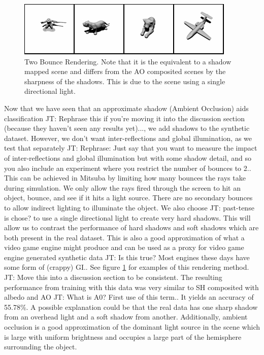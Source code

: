 \documentclass[10pt,twocolumn,letterpaper]{article}
\newcommand{\tompson}[1]{{\color{green} JT: #1}}
\begin{document}
\begin{figure}[h!]
\centering
\includegraphics[width=1.0\columnwidth]{./assets/2bounce_small.png}
\caption{Two Bounce Rendering.  Note that it is the equivalent to a shadow mapped scene and differs from the AO composited scenes by the sharpness of the shadows. This is due to the scene using a single directional light.}
\label{fig:2BOUNCE}
\end{figure}
Now that we have seen that an approximate shadow (Ambient Occlusion) aids classification \tompson{Rephrase this if you're moving it into the discussion section (because they haven't seen any results yet)...}, we add shadows to the synthetic dataset. However, we don't want inter-reflections and global illumination, as we test that separately \tompson{Rephrase: Just say that you want to measure the impact of inter-reflections and global illumination but with some shadow detail, and so you also include an experiment where you restrict the number of bounces to 2.}.  This can be achieved in Mitsuba by limiting how many bounces the rays take during simulation.  We only allow the rays fired through the screen to hit an object, bounce, and see if it hits a light source.  There are no secondary bounces to allow indirect lighting to illuminate the object. We also choose \tompson{past-tense is chose?} to use a single directional light to create very hard shadows.  This will allow us to contrast the performance of hard shadows and soft shadows which are both present in the real dataset.  This is also a good approximation of what a video game engine might produce and can be used as a proxy for video game engine generated synthetic data \tompson{Is this true? Most engines these days have some form of (crappy) GI.}.  See figure \ref{fig:2BOUNCE} for examples of this rendering method.  \tompson{Move this into a discussion section to be consistent.} The resulting performance from training with this data was very similar to SH composited with albedo and AO \tompson{What is A0? First use of this term.}.  It yields an accuracy of 55.78\%.  A possible explanation could be that the real data has one sharp shadow from an overhead light and a soft shadow from another. Additionally, ambient occlusion is a good approximation of the dominant light source in the scene which is large with uniform brightness and occupies a large part of the hemisphere surrounding the object.
\end{document}
